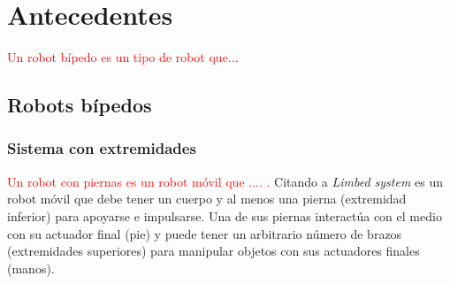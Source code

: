 \documentclass{book}
\begin{document}
\chapter{Antecedentes}
\textcolor{red}{Un robot bípedo es un tipo de robot que... }

	\section{Robots bípedos}
		\subsection{Sistema con extremidades}
		\textcolor{red}{Un robot con piernas es un robot móvil que .... \cite{siciliano2016springer}.}
Citando a \cite{siciliano2016springer}	\textit{Limbed system} es un robot móvil que debe tener un cuerpo y al menos una pierna (extremidad inferior) para apoyarse e impulsarse. Una de sus piernas interactúa con el medio con su actuador final (pie) y 			puede tener un arbitrario número de brazos (extremidades superiores) para 					manipular objetos con sus actuadores finales (manos). \\ \\
	
\end{document}

